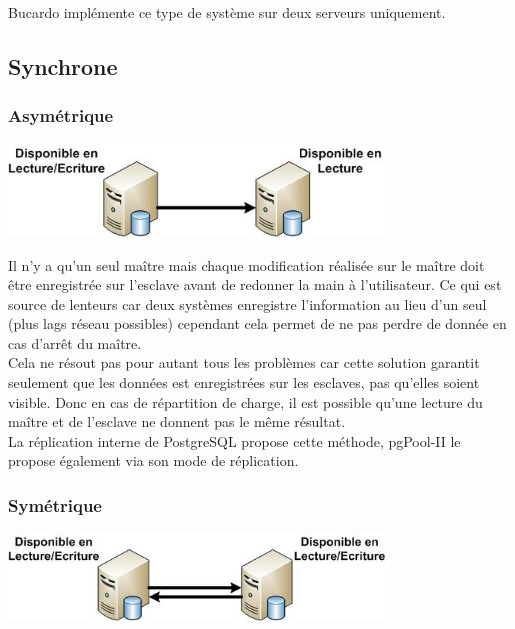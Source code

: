 \documentclass[12pt]{report}
\begin{document}
Bucardo implémente ce type de système sur deux serveurs uniquement. \\

\subsection{Synchrone}

\subsubsection{Asymétrique}

\begin{center}
\includegraphics[width=0.75\textwidth]{./Dessin5.jpg}
\end{center}

Il n'y a qu'un seul maître mais chaque modification réalisée sur le maître doit
être enregistrée sur l'esclave avant de redonner la main à l'utilisateur. Ce qui
est source de lenteurs car deux systèmes enregistre l'information au lieu d'un
seul  (plus lags réseau possibles) cependant cela permet de ne pas perdre de
donnée en cas d’arrêt du maître. \\

Cela ne résout pas pour autant tous les problèmes car cette solution garantit
seulement que les données est enregistrées sur les esclaves, pas qu’elles soient
visible. Donc en cas de répartition de charge, il est possible qu'une lecture du
maître et de l'esclave ne donnent pas le même résultat. \\

La réplication interne de PostgreSQL propose cette méthode, pgPool-II le propose
également via son mode de réplication. \\

\subsubsection{Symétrique}

\begin{center}
\includegraphics[width=0.75\textwidth]{./Dessin6.jpg}
\end{center}
\end{document}
